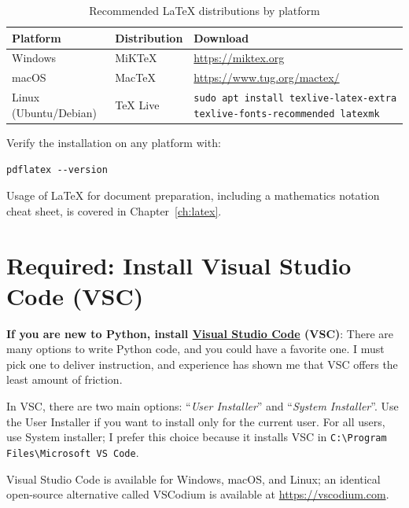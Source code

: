 \begin{table}[htbp]
\centering
\caption{Recommended \LaTeX{} distributions by platform}
\label{tab:latex-distros}
\begin{tabular}{llp{7.5cm}}
\toprule
\textbf{Platform} & \textbf{Distribution} & \textbf{Download} \\
\midrule
Windows & MiKTeX & \url{https://miktex.org} \\
macOS & MacTeX & \url{https://www.tug.org/mactex/} \\
Linux (Ubuntu/Debian) & TeX Live & \texttt{sudo apt install texlive-latex-extra texlive-fonts-recommended latexmk} \\
\bottomrule
\end{tabular}
\end{table}

Verify the installation on any platform with:

\begin{verbatim}
pdflatex --version
\end{verbatim}

\vs
\noindent
Usage of \LaTeX{} for document preparation, including a mathematics
notation cheat sheet, is covered in Chapter~\ref{ch:latex}.
\vs

\section{Required: Install Visual Studio Code (VSC)}\label{sec:vsc}

\textbf{If you are new to Python, install \href{https://code.visualstudio.com}{Visual Studio Code} (VSC)}: There are many options to write Python code, and you could have a favorite one. I must pick one to deliver instruction, and experience has shown me that VSC offers the least amount of friction.

\vs

In VSC, there are two main options: ``\textit{User Installer}'' and ``\textit{System Installer}''. Use the User Installer if you want to install only for the current user. For all users, use System installer; I prefer this choice because it installs VSC in \texttt{C:\textbackslash Program Files\textbackslash Microsoft VS Code}.

\vs

Visual Studio Code is available for Windows, macOS, and Linux; an identical open-source alternative called VSCodium is available at \url{https://vscodium.com}.

